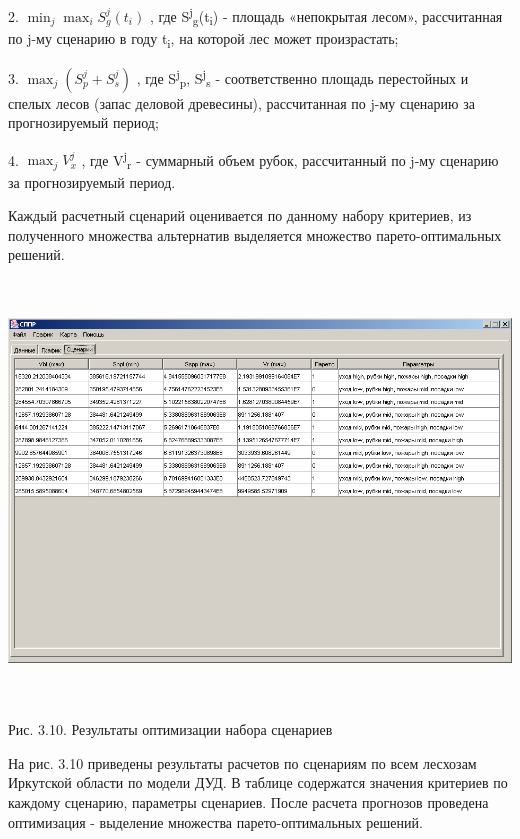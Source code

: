 \documentclass{article}
\begin{document}
2. $\min  _{j} \max  _{i} S_{g}^{j} (t_{i} ) $ , где S\textsuperscript{j}\textsubscript{g}(t\textsubscript{i}) 
- площадь «непокрытая лесом», рассчитанная 
по j-му сценарию в году t\textsubscript{i}, на которой 
лес может произрастать;

3. $\max  _{j} \left( S_{p}^{j} +S_{s}^{j} \right)  $ , где S\textsuperscript{j}\textsubscript{p}, 
S\textsuperscript{j}\textsubscript{s} - соответственно площадь 
перестойных и спелых лесов (запас деловой древесины), 
рассчитанная по j-му сценарию за прогнозируемый 
период;

4. $\max  _{j} V_{x}^{j}  $ , где V\textsuperscript{j}\textsubscript{r } - суммарный 
объем рубок, рассчитанный по j-му сценарию за 
прогнозируемый период.

Каждый расчетный сценарий оценивается по данному 
набору критериев, из полученного множества 
альтернатив выделяется множество парето-оптимальных 
решений.

\includegraphics[width=463pt, height=317pt, keepaspectratio=true]{asyaDisser9_3-fig007.png}

\begin{center}
Рис. 3.10. Результаты оптимизации набора сценариев
\end{center}

На рис. 3.10 приведены результаты расчетов по 
сценариям по всем лесхозам Иркутской области 
по модели ДУД. В таблице содержатся значения 
критериев по каждому сценарию, параметры сценариев. 
После расчета прогнозов проведена оптимизация 
- выделение множества парето-оптимальных решений. 
\end{document}
